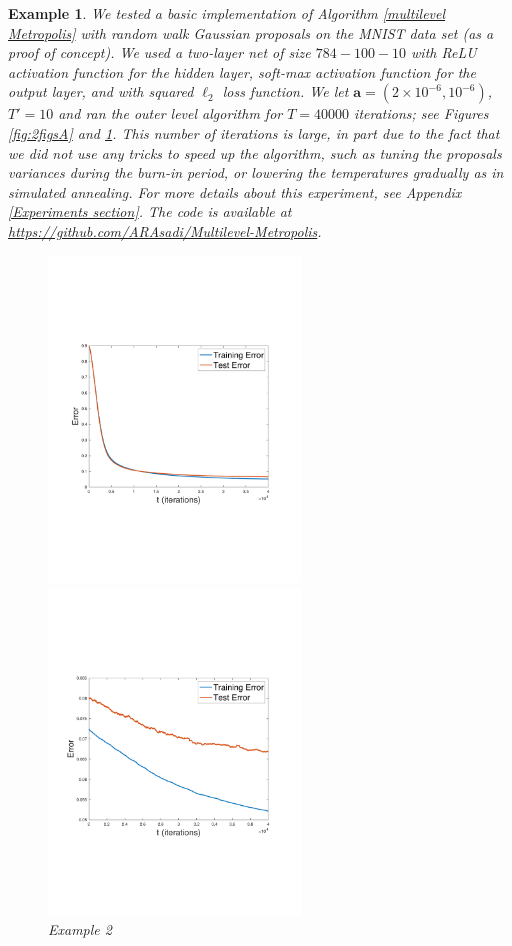 \documentclass{article}
\newtheorem{example}{Example}
\begin{document}
\begin{example}\label{MNIST}\normalfont
We tested a basic implementation of 
Algorithm \ref{multilevel Metropolis}
with random walk Gaussian proposals on the MNIST data set (as a proof of concept). 
We used a two-layer net of size $784-100-10$ with ReLU activation function for the hidden layer, soft-max activation function for the output layer, and with squared $\ell_2$ loss function.
We let $\mathbf{a}=(2\times 10^{-6},10^{-6})$, $T'=10$ and ran the outer level algorithm for $T=40000$ iterations; see Figures \ref{fig:2figsA} and \ref{fig:2figsB}. This number of iterations is large, in part due to the fact that we did not use any tricks to speed up the algorithm, such as tuning the proposals variances during the burn-in period, or lowering the temperatures gradually as in simulated annealing. 
For more details about this experiment, see Appendix \ref{Experiments section}. The code is available at \url{https://github.com/ARAsadi/Multilevel-Metropolis}. 

\begin{figure}[h]
\centering
\parbox{6.7cm}{
\includegraphics[width=6.7cm]{MM_hidden_100_1.pdf}
\caption{Example 2}
\label{fig:2figsA}}
\quad
\begin{minipage}{6.7cm}
\includegraphics[width=6.7cm]{MM_hidden_100_2.pdf}
\caption{Example 2}
\label{fig:2figsB}
\end{minipage}
\end{figure}
\end{example} 
\end{document}
